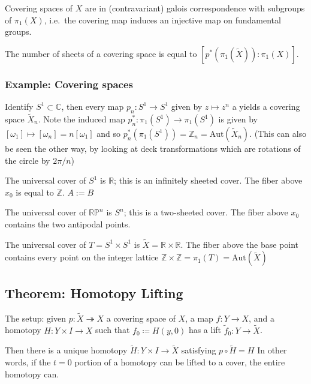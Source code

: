 Covering spaces of \(X\) are in (contravariant) galois correspondence
with subgroups of \(\pi_1(X)\), i.e.~the covering map induces an
injective map on fundamental groups.

The number of sheets of a covering space is equal to
\([p^*(\pi_1(\tilde X)): \pi_1(X)]\).

\hypertarget{example-covering-spaces}{%
\subsubsection{Example: Covering spaces}\label{example-covering-spaces}}

Identify \(S^1 \subset {\mathbb{C}}\), then every map
\(p_n: S^1 \to S^1\) given by \(z\mapsto z^n\) a yields a covering space
\(\tilde X_n\). Note the induced map \(p_n^*: \pi_1(S^1) \to\pi_1(S^1)\)
is given by \([\omega_1] \mapsto [\omega_n] = n[\omega_1]\) and so
\(p_n^*(\pi_1(S^1)) = {\mathbb{Z}}_n = \text{Aut}(\tilde X_n)\). (This
can also be seen the other way, by looking at deck transformations which
are rotations of the circle by \(2\pi/n\))

The universal cover of \(S^1\) is \({\mathbb{R}}\); this is an
infinitely sheeted cover. The fiber above \(x_0\) is equal to
\({\mathbb{Z}}\). \(A:=B\)

The universal cover of \({\mathbb{RP}}^n\) is \(S^n\); this is a
two-sheeted cover. The fiber above \(x_0\) contains the two antipodal
points.

The universal cover of \(T = S^1 \times S^1\) is
\(\tilde X ={\mathbb{R}}\times{\mathbb{R}}\). The fiber above the base
point contains every point on the integer lattice
\({\mathbb{Z}}\times{\mathbb{Z}}= \pi_1(T) = \text{Aut}(\tilde X)\)

\hypertarget{theorem-homotopy-lifting}{%
\subsection{Theorem: Homotopy Lifting}\label{theorem-homotopy-lifting}}

The setup: given \(p: \tilde X \twoheadrightarrow X\) a covering space
of \(X\), a map \(f: Y \to X\), and a homotopy \(H: Y\times I \to X\)
such that \(f_0 \coloneqq H(y, 0)\) has a lift
\(\tilde f_0: Y\to\tilde X\).

Then there is a unique homotopy \(\tilde H: Y \times I \to\tilde X\)
satisfying \(p\circ \tilde H = H\) In other words, if the \(t=0\)
portion of a homotopy can be lifted to a cover, the entire homotopy can.

